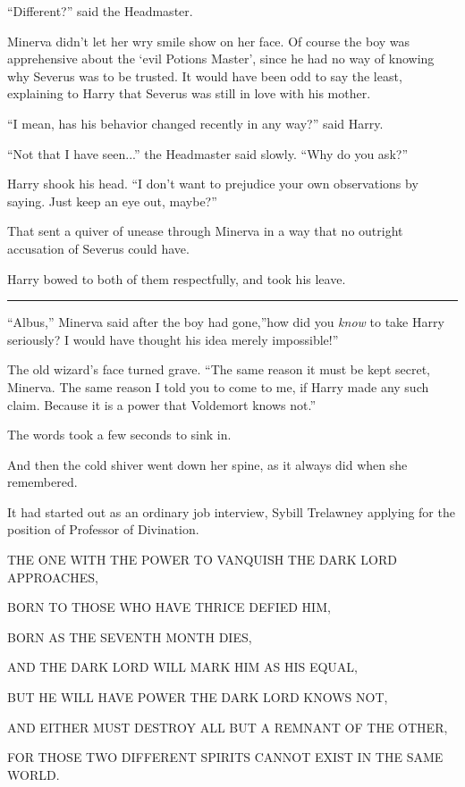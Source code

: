 ``Different?'' said the Headmaster.

Minerva didn't let her wry smile show on her face. Of course the boy was
apprehensive about the `evil Potions Master', since he had no way of
knowing why Severus was to be trusted. It would have been odd to say the
least, explaining to Harry that Severus was still in love with his
mother.

``I mean, has his behavior changed recently in any way?'' said Harry.

``Not that I have seen...'' the Headmaster said slowly. ``Why do
you ask?''

Harry shook his head. ``I don't want to prejudice your own observations
by saying. Just keep an eye out, maybe?''

That sent a quiver of unease through Minerva in a way that no outright
accusation of Severus could have.

Harry bowed to both of them respectfully, and took his leave.

\begin{center}\rule{3in}{0.4pt}\end{center}

``Albus,'' Minerva said after the boy had gone,''how did you \emph{know}
to take Harry seriously? I would have thought his idea merely
impossible!''

The old wizard's face turned grave. ``The same reason it must be kept
secret, Minerva. The same reason I told you to come to me, if Harry made
any such claim. Because it is a power that Voldemort knows not.''

The words took a few seconds to sink in.

And then the cold shiver went down her spine, as it always did when she
remembered.

It had started out as an ordinary job interview, Sybill Trelawney
applying for the position of Professor of Divination.

THE ONE WITH THE POWER TO VANQUISH THE DARK LORD APPROACHES,

BORN TO THOSE WHO HAVE THRICE DEFIED HIM,

BORN AS THE SEVENTH MONTH DIES,

AND THE DARK LORD WILL MARK HIM AS HIS EQUAL,

BUT HE WILL HAVE POWER THE DARK LORD KNOWS NOT,

AND EITHER MUST DESTROY ALL BUT A REMNANT OF THE OTHER,

FOR THOSE TWO DIFFERENT SPIRITS CANNOT EXIST IN THE SAME WORLD.

